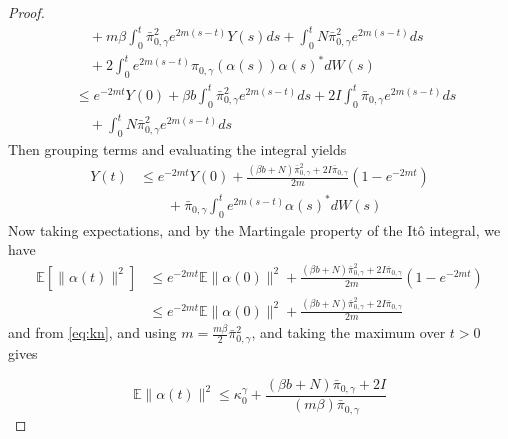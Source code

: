 \documentclass[journal,onecolumn]{IEEEtran}
\newcommand{\CE}{\mathbb{E}}
\newcommand{\alt}{\alpha(t)}
\newcommand{\als}{\alpha(s)}
\newcommand{\browns}{W(s)}
\newcommand{\dimn}{N}
\newcommand{\kn}{\kappa_0}
\newcommand{\knw}{\kn^{\idw}}
\newcommand{\ids}{\pi}
\newcommand{\idw}{\gamma}
\newcommand{\isp}{0,\idw}
\newcommand{\idistmaxw}{\bar{\ids}_{\isp}}
\newcommand{\idiffc}{I}
\newcommand{\dissm}{m}
\newcommand{\dissb}{b}
\newcommand{\idistrw}{\ids_{\isp}}
\begin{document}
{\begin{proof}
\begin{align*}
& \quad + \dissm\beta \int_0^t\idistmaxw^2 e^{2m(s-t)}Y(s)ds + \int_0^t\dimn \idistmaxw^2 e^{2m(s-t)}ds \\
&\quad + 2\int_0^t e^{2m(s-t)} \idistrw(\als)\als^* d\browns \\
&\leq e^{-2mt} Y(0) + \beta \dissb \int_0^t \idistmaxw^2 e^{2m(s-t)}ds + 2\idiffc \int_0^t\idistmaxw e^{2m(s-t)}ds \\&\quad+ \int_0^t \dimn \idistmaxw^2 e^{2m(s-t)} ds
\end{align*}
Then grouping terms and evaluating the integral yields
\begin{align*}
    Y(t) &\leq e^{-2mt}Y(0) + \frac{(\beta \dissb + \dimn)\idistmaxw^2 + 2\idiffc\idistmaxw}{2m}\left(1-e^{-2mt} \right) \\&\quad \quad + \idistmaxw\int_0^te^{2m(s-t)}\als^*d\browns 
\end{align*}
Now taking expectations, and by the Martingale property of the It\^o integral, we have
\begin{align*}
    \CE[\|\alt\|^2] &\leq e^{-2mt}\CE\|\alpha(0)\|^2 + \frac{(\beta \dissb + \dimn)\idistmaxw^2 + 2\idiffc\idistmaxw}{2m} \left(1-e^{-2mt} \right) \\
    &\leq e^{-2mt}\CE\|\alpha(0)\|^2 + \frac{(\beta \dissb + \dimn)\idistmaxw^2 + 2\idiffc\idistmaxw}{2m}
\end{align*}
and from \eqref{eq:kn}, and using $m = \frac{\dissm\beta}{2}\idistmaxw^2$, and taking the maximum over $t > 0$ gives

\[\CE \|\alt\|^2 \leq \knw + \frac{(\beta \dissb + \dimn)\idistmaxw + 2\idiffc}{(\dissm\beta)\idistmaxw}\]
\end{proof}

}
\end{document}
